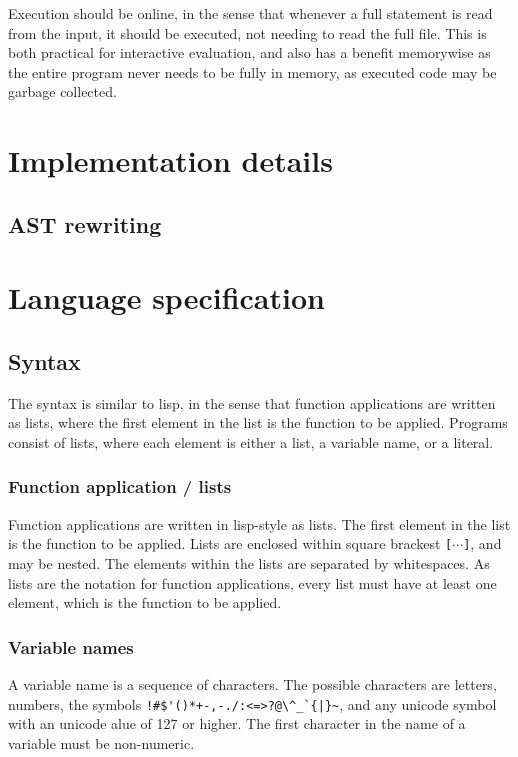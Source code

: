 \documentclass[11pt]{report}
\begin{document}
Execution should be online, in the sense that whenever a full statement is read from the input, it should be executed, not needing to read the full file. This is both practical for interactive evaluation, and also has a benefit memorywise as the entire program never needs to be fully in memory, as executed code may be garbage collected.

\section{Implementation details}
\subsection{AST rewriting}

\section{Language specification}

\subsection{Syntax}
The syntax is similar to lisp, in the sense that function applications are written as lists, where the first element in the list is the function to be applied.
Programs consist of lists, where each element is either a list, a variable name, or a literal.

\subsubsection{Function application / lists}
Function applications are written in lisp-style as lists. The first element in the list is the function to be applied.
Lists are enclosed within square brackest \verb|[|$\cdots$\verb|]|, and may be nested. The elements within the lists are separated by whitespaces. 
As lists are the notation for function applications, every list must have at least one element, which is the function to be applied.

\subsubsection{Variable names}
A variable name is a sequence of characters. The possible characters are letters, numbers, the symbols \verb"!#$'()*+-,-./:<=>?@\^_`{|}~", and any unicode symbol with an unicode alue of 127 or higher. The first character in the name of a variable must be non-numeric.
\end{document}

